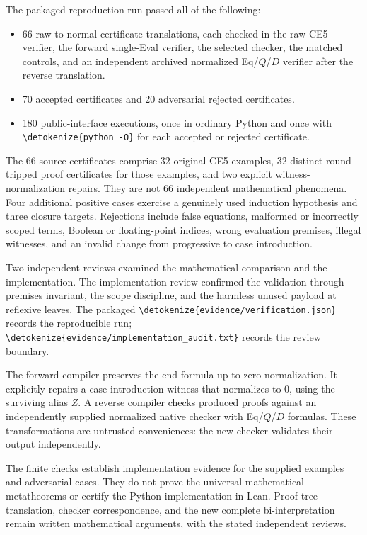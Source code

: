 \documentclass[11pt]{article}
\theoremstyle{definition}
\newcommand{\file}[1]{\expandafter\nolinkurl\expandafter{\detokenize{#1}}}
\begin{document}
The packaged reproduction run passed all of the following:
\begin{itemize}
\item 66 raw-to-normal certificate translations, each checked in the
raw CE5 verifier, the forward single-Eval verifier, the selected
checker, the matched controls, and an independent archived normalized
Eq/$Q$/$D$ verifier after the reverse translation.
\item 70 accepted certificates and 20 adversarial rejected certificates.
\item 180 public-interface executions, once in ordinary Python and once
with \file{python -O} for each accepted or rejected certificate.
\end{itemize}
The 66 source certificates comprise 32 original CE5 examples, 32 distinct
round-tripped proof certificates for those examples, and two explicit
witness-normalization repairs. They are not 66 independent mathematical
phenomena. Four additional positive cases exercise a genuinely used
induction hypothesis and three closure targets. Rejections include false
equations, malformed or incorrectly scoped terms, Boolean or floating-point
indices, wrong evaluation premises, illegal witnesses, and an invalid
change from progressive to case introduction.

Two independent reviews examined the mathematical comparison and the
implementation. The implementation review confirmed the validation-through-premises invariant,
the scope discipline, and the harmless unused payload at reflexive leaves.
The packaged \file{evidence/verification.json} records the reproducible
run; \file{evidence/implementation_audit.txt} records the review boundary.

The forward compiler preserves the end formula up to zero normalization.
It explicitly repairs a case-introduction witness that normalizes to $0$,
using the surviving alias $Z$. A reverse compiler checks produced proofs
against an independently supplied normalized native checker with Eq/$Q$/$D$
formulas. These transformations are untrusted conveniences: the new checker
validates their output independently.

The finite checks establish implementation evidence for the supplied
examples and adversarial cases. They do not prove the universal mathematical
metatheorems or certify the Python implementation in Lean. Proof-tree
translation, checker correspondence, and the new complete bi-interpretation
remain written mathematical arguments, with the stated independent reviews.
\end{document}
